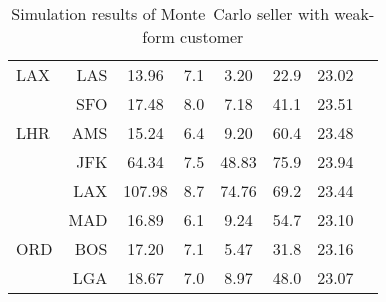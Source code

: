 \begin{table}[h]
\begin{center}
\begin{tabular}{l r c c c c c c}
LAX  &  LAS &  13.96  &    7.1  &   3.20  &   22.9  &  23.02  \\
     &  SFO &  17.48  &    8.0  &   7.18  &   41.1  &  23.51  \\[.5ex]
LHR  &  AMS &  15.24  &    6.4  &   9.20  &   60.4  &  23.48  \\
     &  JFK &  64.34  &    7.5  &  48.83  &   75.9  &  23.94  \\
     &  LAX &  107.98  &    8.7  &  74.76  &   69.2  &  23.44  \\
     &  MAD &  16.89  &    6.1  &   9.24  &   54.7  &  23.10  \\[.5ex]
ORD  &  BOS &  17.20  &    7.1  &   5.47  &   31.8  &  23.16  \\
     &  LGA &  18.67  &    7.0  &   8.97  &   48.0  &  23.07  \\
           \bottomrule
        \end{tabular}
        \caption{Simulation results of Monte~Carlo seller with weak-form customer}
        \label{tbl:resultsMCWeak}
    \end{center}
\end{table}
